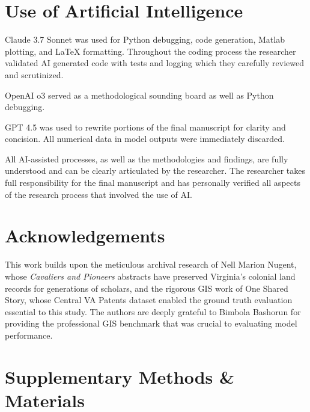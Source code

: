 \section{\DIFdelbegin {}\DIFdelend Use of Artificial
Intelligence}\label{use-of-artificial-intelligence}

Claude 3.7 Sonnet was used for Python debugging, code generation, Matlab
plotting, and LaTeX formatting. Throughout the coding process the
researcher validated AI generated code with tests and logging which they
carefully reviewed and scrutinized.

OpenAI o3 served as a methodological sounding board as well as Python
debugging.

GPT 4.5 was used to rewrite portions of the final manuscript for clarity
and concision. All numerical data in model outputs were immediately
discarded.

All AI-assisted processes, as well as the methodologies and findings,
are fully understood and can be clearly articulated by the researcher.
The researcher takes full responsibility for the final manuscript and
has personally verified all aspects of the research process that
involved the use of AI.

\section{\DIFdelbegin {}\DIFdelend Acknowledgements}\label{acknowledgements}

This work builds upon the meticulous archival research of Nell Marion
Nugent, whose \emph{Cavaliers and Pioneers} abstracts have preserved
Virginia's colonial land records for generations of scholars, and the
rigorous GIS work of One Shared Story, whose Central VA Patents dataset
enabled the ground truth evaluation essential to this study. The authors
are deeply grateful to Bimbola Bashorun \citep{Bashorun2025_gis} for
providing the professional GIS benchmark that was crucial to evaluating
model performance.

\DIFaddbegin \section*{}\label{appendices}

\appendix\DIFaddend \section{Supplementary Methods \&
Materials}\label{appendix-a-supplementary-methods-materials}

